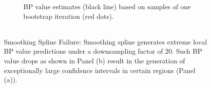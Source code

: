 \begin{figure}[!htb]
\begin{subfigure}{.42\textwidth}
  \caption[Estimate Single Bootstrap Sample]{
      BP value estimates (black line) based on samples of one bootstrap iteration (red dots).
      \\
        \\}
    \label{subfig:ex-spline-failure-bootstrap}
\end{subfigure}
\caption[Smoothing Spline Failure]{
    Smoothing Spline Failure:
    Smoothing spline generates extreme local BP value predictions
    under a downsampling factor of 20.
    Such BP value drops as shown in Panel (b) result in
    the generation of exceptionally
    large confidence intervals in certain regions (Panel (a)).}
\label{fig:ex-spline-failure}
\end{figure}






%
%
%
%
%












